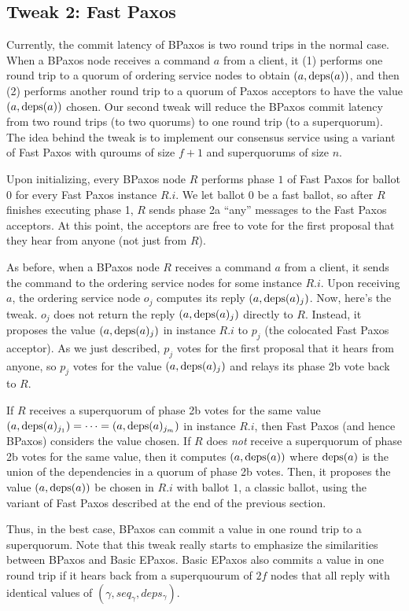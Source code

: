 \documentclass{mwhittaker}
\begin{document}
\subsection{Tweak 2: Fast Paxos}
Currently, the commit latency of BPaxos is two round trips in the normal case.
When a BPaxos node receives a command $a$ from a client, it (1) performs one
round trip to a quorum of ordering service nodes to obtain $(a, \text{deps}(a))$, and
then (2) performs another round trip to a quorum of Paxos acceptors to have the
value $(a, \text{deps}(a))$ chosen. Our second tweak will reduce the BPaxos commit
latency from two round trips (to two quorums) to one round trip (to a
superquorum). The idea behind the tweak is to implement our consensus service
using a variant of Fast Paxos with quroums of size $f + 1$ and superquorums of
size $n$.

Upon initializing, every BPaxos node $R$ performs phase $1$ of Fast Paxos for
ballot $0$ for every Fast Paxos instance $R.i$. We let ballot $0$ be a fast
ballot, so after $R$ finishes executing phase 1, $R$ sends phase 2a ``any''
messages to the Fast Paxos acceptors. At this point, the acceptors are free to
vote for the first proposal that they hear from anyone (not just from $R$).

As before, when a BPaxos node $R$ receives a command $a$ from a client, it
sends the command to the ordering service nodes for some instance $R.i$.
Upon receiving $a$, the ordering service node $o_j$ computes its reply $(a,
\text{deps}(a)_j)$. Now, here's the tweak. $o_j$ does not return the reply $(a,
\text{deps}(a)_j)$ directly to $R$. Instead, it proposes the value $(a, \text{deps}(a)_j)$
in instance $R.i$ to $p_j$ (the colocated Fast Paxos acceptor). As we just
described, $p_j$ votes for the first proposal that it hears from anyone, so
$p_j$ votes for the value $(a, \text{deps}(a)_j)$ and relays its phase 2b vote back
to $R$.

If $R$ receives a superquorum of phase 2b votes for the same value $(a,
\text{deps}(a)_{j_1}) = \cdots = (a, \text{deps}(a)_{j_{m}})$ in instance $R.i$, then Fast
Paxos (and hence BPaxos) considers the value chosen. If $R$ does \emph{not}
receive a superquorum of phase 2b votes for the same value, then it computes
$(a, \text{deps}(a))$ where $\text{deps}(a)$ is the union of the dependencies in a quorum
of phase 2b votes. Then, it proposes the value $(a, \text{deps}(a))$ be chosen in
$R.i$ with ballot $1$, a classic ballot, using the variant of Fast Paxos
described at the end of the previous section.

Thus, in the best case, BPaxos can commit a value in one round trip to a
superquorum. Note that this tweak really starts to emphasize the similarities
between BPaxos and Basic EPaxos. Basic EPaxos also commits a value in one round
trip if it hears back from a superquourum of $2f$ nodes that all reply with
identical values of $(\gamma, seq_\gamma, deps_\gamma)$.
\end{document}
